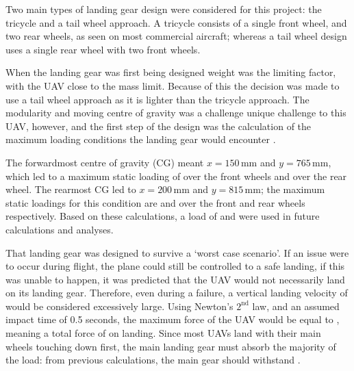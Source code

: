 \documentclass[../../main.tex]{subfiles}
\begin{document}
Two main types of landing gear design were considered for this project: the tricycle and a tail wheel approach.
A tricycle consists of a single front wheel, and two rear wheels, as seen on most commercial aircraft; whereas a tail wheel design uses a single rear wheel with two front wheels.


When the landing gear was first being designed weight was the limiting factor, with the UAV close to the  mass limit.
Because of this the decision was made to use a tail wheel approach as it is lighter than the tricycle approach.
The modularity and moving centre of gravity was a challenge unique challenge to this UAV, however, and the first step of the design was the calculation of the maximum loading conditions the landing gear would encounter \cite{goud-14}. 


The forwardmost centre of gravity (CG) meant $x=150\,\mathrm{mm}$ and $y=765\,\mathrm{mm}$, which led to a maximum static loading of  over the front wheels and  over the rear wheel.
The rearmost CG led to $x=200\,\mathrm{mm}$ and $y=815\,\mathrm{mm}$; the maximum static loadings for this condition are  and  over the front and rear wheels respectively.
Based on these calculations, a load of  and  were used in future calculations and analyses. 

That landing gear was designed to survive a ‘worst case scenario’.
If an issue were to occur during flight, the plane could still be controlled to a safe landing, if this was unable to happen, it was predicted that the UAV would not necessarily land on its landing gear.
Therefore, even during a failure, a vertical landing velocity of  would be considered excessively large.
Using Newton's $2^\mathrm{nd}$ law, and an assumed impact time of 0.5 seconds, the maximum force of the UAV would be equal to , meaning a total force of  on landing.
Since most UAVs land with their main wheels touching down first, the main landing gear must absorb the majority of the load: from previous calculations, the main gear should withstand .  
\end{document}
